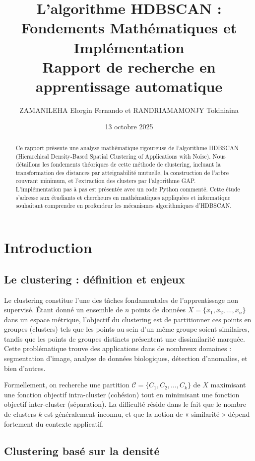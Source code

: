 \documentclass[11pt,a4paper]{article}
\title{L'algorithme HDBSCAN : Fondements Mathématiques et Implémentation\\ Rapport de recherche en apprentissage automatique}
\author{ZAMANILEHA Elorgin Fernando et RANDRIAMAMONJY Tokiniaina}
\date{13 octobre 2025}
\begin{document}
\maketitle

\begin{abstract}
Ce rapport présente une analyse mathématique rigoureuse de l'algorithme HDBSCAN (Hierarchical Density-Based Spatial Clustering of Applications with Noise). Nous détaillons les fondements théoriques de cette méthode de clustering, incluant la transformation des distances par atteignabilité mutuelle, la construction de l'arbre couvrant minimum, et l'extraction des clusters par l'algorithme GAP. L'implémentation pas à pas est présentée avec un code Python commenté. Cette étude s'adresse aux étudiants et chercheurs en mathématiques appliquées et informatique souhaitant comprendre en profondeur les mécanismes algorithmiques d'HDBSCAN.
\end{abstract}

\tableofcontents

\section{Introduction}

\subsection{Le clustering : définition et enjeux}

Le clustering constitue l'une des tâches fondamentales de l'apprentissage non supervisé. Étant donné un ensemble de $n$ points de données $X = \{x_1, x_2, \ldots, x_n\}$ dans un espace métrique, l'objectif du clustering est de partitionner ces points en groupes (clusters) tels que les points au sein d'un même groupe soient similaires, tandis que les points de groupes distincts présentent une dissimilarité marquée. Cette problématique trouve des applications dans de nombreux domaines : segmentation d'image, analyse de données biologiques, détection d'anomalies, et bien d'autres.

Formellement, on recherche une partition $\mathcal{C} = \{C_1, C_2, \ldots, C_k\}$ de $X$ maximisant une fonction objectif intra-cluster (cohésion) tout en minimisant une fonction objectif inter-cluster (séparation). La difficulté réside dans le fait que le nombre de clusters $k$ est généralement inconnu, et que la notion de « similarité » dépend fortement du contexte applicatif.

\subsection{Clustering basé sur la densité}
\end{document}
